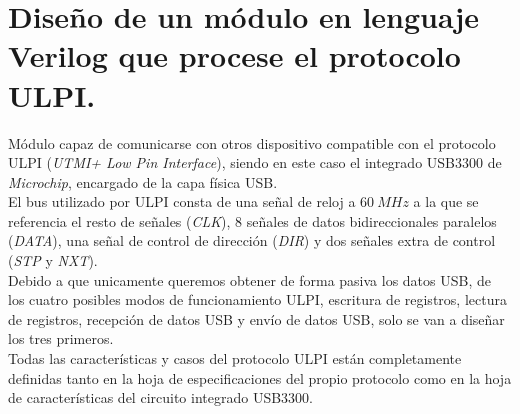 \section{Diseño de un módulo en lenguaje Verilog que procese el protocolo ULPI.}
Módulo capaz de comunicarse con otros dispositivo compatible con el protocolo ULPI (\emph{UTMI+ Low Pin Interface}), siendo en este caso el integrado USB3300 de \emph{Microchip}, encargado de la capa física USB. \\
El bus utilizado por ULPI consta de una señal de reloj a $60~MHz$ a la que se referencia el resto de señales (\emph{CLK}), 8 señales de datos bidireccionales paralelos (\emph{DATA}), una señal de control de dirección (\emph{DIR}) y dos señales extra de control (\emph{STP} y \emph{NXT}). \\
Debido a que unicamente queremos obtener de forma pasiva los datos USB, de los cuatro posibles modos de funcionamiento ULPI, escritura de registros, lectura de registros, recepción de datos USB y envío de datos USB, solo se van a diseñar los tres primeros. \\
Todas las características y casos del protocolo ULPI están completamente definidas tanto en la hoja de especificaciones del propio protocolo\cite{ulpi-specs} como en la hoja de características del circuito integrado USB3300\cite{microchip:usb3300}.
